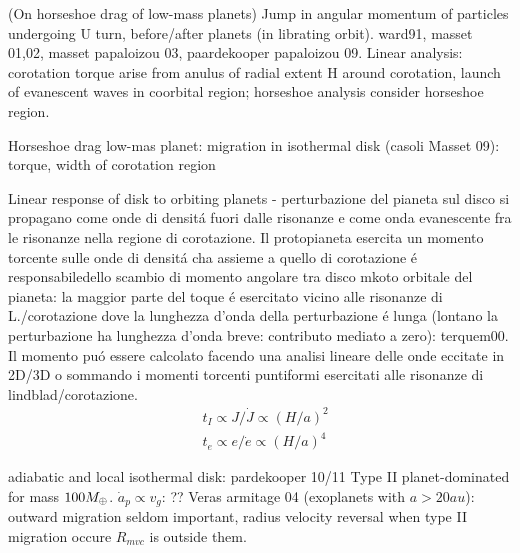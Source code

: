 \begin{workout}
(On horseshoe drag of low-mass planets)
Jump in angular momentum of particles undergoing U turn, before/after planets (in librating orbit).
ward91, masset 01,02, masset papaloizou 03, paardekooper papaloizou 09.
Linear analysis: corotation torque arise from anulus of radial extent H around corotation, launch of evanescent waves in coorbital region; horseshoe analysis consider horseshoe region.
\end{workout}

\begin{workout}
Horseshoe drag low-mas planet: migration in isothermal disk (casoli Masset 09): torque, width of corotation region
\end{workout}

\begin{workout}
Linear response of disk to orbiting planets - perturbazione del pianeta sul disco si propagano come onde di densit\'a fuori dalle risonanze e come onda evanescente fra le risonanze nella regione di corotazione. Il protopianeta esercita un momento torcente sulle onde di densit\'a cha assieme  a quello di corotazione \'e responsabiledello scambio di momento angolare tra disco mkoto orbitale del pianeta: la maggior parte del toque \'e esercitato vicino alle risonanze di L./corotazione dove la lunghezza d'onda della perturbazione \'e lunga (lontano la perturbazione ha lunghezza d'onda breve: contributo mediato a zero): terquem00.
Il momento pu\'o essere calcolato facendo una analisi lineare delle onde eccitate in 2D/3D o sommando i momenti torcenti puntiformi esercitati alle risonanze di lindblad/corotazione.
\begin{align}
&t_I\propto J/\dot{J}\propto(H/a)^2\\
&t_e\propto e/\dot{e}\propto(H/a)^4
\end{align}
\end{workout}

\begin{workout}
adiabatic and local isothermal disk: pardekooper 10/11
Type II planet-dominated for mass $100M_{\oplus}{}$.
$\dot{a}_p\propto v_g$: ??
Veras armitage 04 (exoplanets with $a>20au$): outward migration seldom important, radius velocity reversal when type II migration occure $R_{mvc}$ is outside them.
\end{workout}

